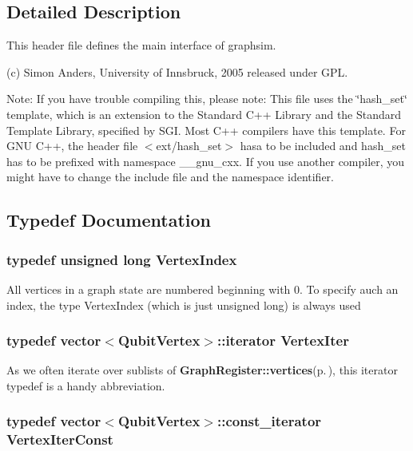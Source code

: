 \subsection{Detailed Description}
This header file defines the main interface of graphsim.

(c) Simon Anders, University of Innsbruck, 2005 released under GPL.

Note: If you have trouble compiling this, please note: This file uses the \char`\"{}hash\_\-set\char`\"{} template, which is an extension to the Standard C++ Library and the Standard Template Library, specified by SGI. Most C++ compilers have this template. For GNU C++, the header file $<$ext/hash\_\-set$>$ hasa to be included and hash\_\-set has to be prefixed with namespace \_\-\_\-gnu\_\-cxx. If you use another compiler, you might have to change the include file and the namespace identifier.

\subsection{Typedef Documentation}
\subsubsection{\setlength{\rightskip}{0pt plus 5cm}typedef unsigned long {\bf Vertex\-Index}}\label{graphsim_8h_a1}


All vertices in a graph state are numbered beginning with 0. To specify auch an index, the type Vertex\-Index (which is just unsigned long) is always used 
\subsubsection{\setlength{\rightskip}{0pt plus 5cm}typedef vector$<${\bf Qubit\-Vertex}$>$::iterator {\bf Vertex\-Iter}}\label{graphsim_8h_a2}


As we often iterate over sublists of {\bf Graph\-Register::vertices}{\rm (p.\,\pageref{classGraphRegister_o0})}, this iterator typedef is a handy abbreviation. 
\subsubsection{\setlength{\rightskip}{0pt plus 5cm}typedef vector$<${\bf Qubit\-Vertex}$>$::const\_\-iterator {\bf Vertex\-Iter\-Const}}\label{graphsim_8h_a4}


